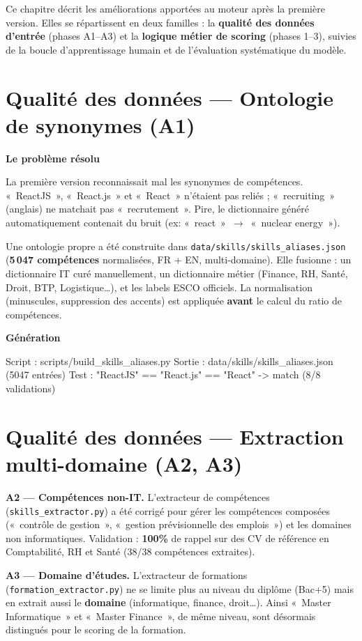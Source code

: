 \documentclass[12pt,a4paper]{report}
\newenvironment{codebox}[1][]{%
  \begin{framed}\noindent\textbf{\small\textcolor{codeblue}{#1}}\\[2pt]\ttfamily\small%
}{\end{framed}}
\newenvironment{whybox}[1][Pourquoi ce choix ?]{%
  \colorbox{yellow!20}{\textbf{\textcolor{navyblue}{#1}}}\vspace{2pt}
  \begin{framed}%
}{\end{framed}}
\newcommand{\filepath}[1]{\texttt{\small\textcolor{codeblue}{#1}}}
\begin{document}
Ce chapitre décrit les améliorations apportées au moteur après la première version.
Elles se répartissent en deux familles : la \textbf{qualité des données d'entrée}
(phases A1–A3) et la \textbf{logique métier de scoring} (phases 1–3), suivies de la
boucle d'apprentissage humain et de l'évaluation systématique du modèle.

\section{Qualité des données — Ontologie de synonymes (A1)}

\begin{whybox}[Le problème résolu]
La première version reconnaissait mal les synonymes de compétences. «~ReactJS~»,
«~React.js~» et «~React~» n'étaient pas reliés ; «~recruiting~» (anglais) ne
matchait pas «~recrutement~». Pire, le dictionnaire généré automatiquement
contenait du bruit (ex: «~react~»~$\rightarrow$~«~nuclear energy~»).
\end{whybox}

Une ontologie propre a été construite dans \filepath{data/skills/skills\_aliases.json}
(\textbf{5\,047 compétences} normalisées, FR + EN, multi-domaine). Elle fusionne :
un dictionnaire IT curé manuellement, un dictionnaire métier (Finance, RH, Santé,
Droit, BTP, Logistique\ldots), et les labels ESCO officiels. La normalisation
(minuscules, suppression des accents) est appliquée \textbf{avant} le calcul du
ratio de compétences.

\begin{codebox}[Génération]
Script : scripts/build_skills_aliases.py
Sortie : data/skills/skills_aliases.json (5047 entrées)
Test   : "ReactJS" == "React.js" == "React" -> match (8/8 validations)
\end{codebox}

\section{Qualité des données — Extraction multi-domaine (A2, A3)}

\textbf{A2 — Compétences non-IT.} L'extracteur de compétences
(\filepath{skills\_extractor.py}) a été corrigé pour gérer les compétences
composées («~contrôle de gestion~», «~gestion prévisionnelle des emplois~») et les
domaines non informatiques. Validation : \textbf{100\%} de rappel sur des CV de
référence en Comptabilité, RH et Santé (38/38 compétences extraites).

\textbf{A3 — Domaine d'études.} L'extracteur de formations
(\filepath{formation\_extractor.py}) ne se limite plus au niveau du diplôme
(Bac+5) mais en extrait aussi le \textbf{domaine} (informatique, finance,
droit\ldots). Ainsi «~Master Informatique~» et «~Master Finance~», de même niveau,
sont désormais distingués pour le scoring de la formation.
\end{document}
